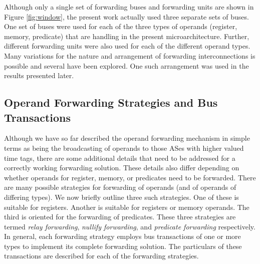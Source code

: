 \documentclass[10pt,dvips]{article}
\begin{document}
Although only a single set of forwarding buses and forwarding units
are shown in Figure \ref{fig:window}, the present work
actually used three separate sets of buses.  One set of buses
were used for each of the three types of operands (register, memory,
predicate) that are handling in the present microarchitecture.
Further, different forwarding units were also used for each of the
different operand types.
Many variations for the nature and arrangement 
of forwarding interconnections is possible and several have been explored.
One such arrangement was used in the results presented later.
%
%
\subsection{Operand Forwarding Strategies and Bus Transactions}
%
Although we have so far described the operand forwarding mechanism
in simple terms as being the broadcasting of operands
to those ASes with higher valued 
time tags, there are some additional details that need to be
addressed for a correctly working forwarding solution.
These details also differ depending on whether operands for
register, memory, or predicates need to be forwarded.
There are many possible strategies for forwarding of operands
(and of operands of differing types). 
We now briefly outline three such strategies.
One of these is suitable for registers.
Another is suitable for registers or memory operands.
The third is oriented for the forwarding of predicates.
These three strategies are termed \textit{relay forwarding},
\textit{nullify forwarding}, and \textit{predicate forwarding}
respectively.
In general, each forwarding strategy employs bus transactions
of one or more types to implement its complete forwarding solution.
The particulars of these transactions are described for each
of the forwarding strategies.
%
%
\end{document}
